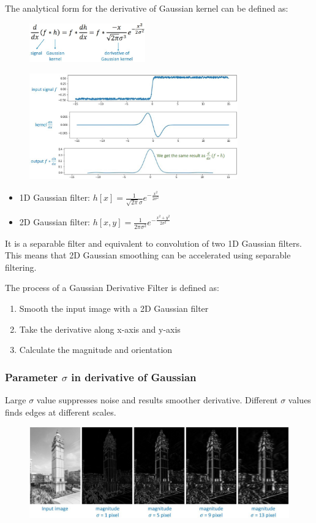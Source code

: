 \documentclass{report}
\begin{document}
The analytical form for the derivative of Gaussian kernel can be defined as:
\begin{figure}[h]
    \centering
    \includegraphics[width=5cm]{Gaussian derivative.JPG}
\end{figure}
\begin{figure}[h]
    \centering
    \includegraphics[width=9cm]{Derivative gaussian.JPG}
\end{figure}

\pagebreak

\begin{itemize}
    \item 1D Gaussian filter: $h[x] = \frac{1}{\sqrt{2\pi}\sigma} e^{-\frac{x^2}{2\sigma^2}}$ 
    \item 2D Gaussian filter: $h[x, y] = \frac{1}{2\pi\sigma^2} e^{-\frac{x^2 + y^2}{2\sigma^2}}$ 
\end{itemize}

It is a separable filter and equivalent to convolution of two 1D Gaussian
filters. This means that 2D Gaussian smoothing can be accelerated using
separable filtering. 

The process of a Gaussian Derivative Filter is defined as:
\begin{enumerate}
    \item Smooth the input image with a 2D Gaussian filter 
    \item Take the derivative along x-axis and y-axis 
    \item Calculate the magnitude and orientation 
\end{enumerate}

\subsubsection{Parameter $\sigma$ in derivative of Gaussian}
Large $\sigma$ value suppresses noise and results smoother derivative. Different
$\sigma$ values finds edges at different scales. 
\begin{figure}[h]
    \centering
    \includegraphics[width=12cm]{Gaussian derivative sigma.JPG}
\end{figure}
\end{document}
